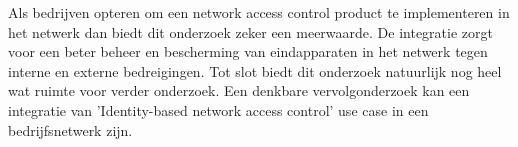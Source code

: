 \newline
\newline
Als bedrijven opteren om een network access control product te implementeren in het netwerk dan biedt dit onderzoek zeker een meerwaarde. De integratie zorgt voor een beter beheer en bescherming van eindapparaten in het netwerk tegen interne en externe bedreigingen.  
\newline
\newline
Tot slot biedt dit onderzoek natuurlijk nog heel wat ruimte voor verder onderzoek. Een denkbare vervolgonderzoek kan een integratie van 'Identity-based network access control' use case in een bedrijfsnetwerk zijn.

  

